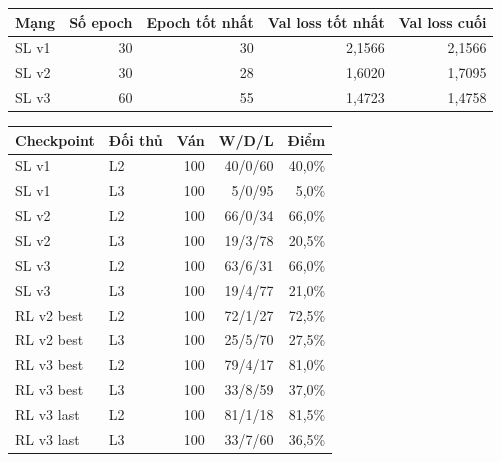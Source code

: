 \begin{center}\small
\begin{tabular}{@{}lrrrr@{}}
\toprule
Mạng & Số epoch & Epoch tốt nhất & Val loss tốt nhất & Val loss cuối \\
\midrule
SL v1 & 30 & 30 & 2,1566 & 2,1566 \\
SL v2 & 30 & 28 & 1,6020 & 1,7095 \\
SL v3 & 60 & 55 & 1,4723 & 1,4758 \\
\bottomrule
\end{tabular}
\end{center}
\begin{center}\small
\begin{tabular}{@{}llrrr@{}}
\toprule
Checkpoint & Đối thủ & Ván & W/D/L & Điểm \\
\midrule
SL v1 & L2 & 100 & 40/0/60 & 40,0\% \\
SL v1 & L3 & 100 & 5/0/95 & 5,0\% \\
SL v2 & L2 & 100 & 66/0/34 & 66,0\% \\
SL v2 & L3 & 100 & 19/3/78 & 20,5\% \\
SL v3 & L2 & 100 & 63/6/31 & 66,0\% \\
SL v3 & L3 & 100 & 19/4/77 & 21,0\% \\
RL v2 best & L2 & 100 & 72/1/27 & 72,5\% \\
RL v2 best & L3 & 100 & 25/5/70 & 27,5\% \\
RL v3 best & L2 & 100 & 79/4/17 & 81,0\% \\
RL v3 best & L3 & 100 & 33/8/59 & 37,0\% \\
RL v3 last & L2 & 100 & 81/1/18 & 81,5\% \\
RL v3 last & L3 & 100 & 33/7/60 & 36,5\% \\
\bottomrule
\end{tabular}
\end{center}